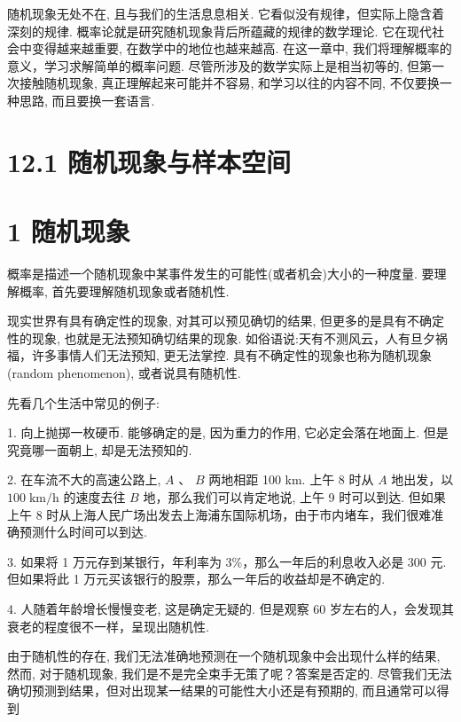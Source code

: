 \documentclass[10pt]{article}
\begin{document}
随机现象无处不在, 且与我们的生活息息相关. 它看似没有规律，但实际上隐含着深刻的规律. 概率论就是研究随机现象背后所蕴藏的规律的数学理论. 它在现代社会中变得越来越重要, 在数学中的地位也越来越高. 在这一章中, 我们将理解概率的意义，学习求解简单的概率问题. 尽管所涉及的数学实际上是相当初等的, 但第一次接触随机现象, 真正理解起来可能并不容易, 和学习以往的内容不同, 不仅要换一种思路, 而且要换一套语言.

\section*{12.1 随机现象与样本空间}

\section*{1 随机现象}

概率是描述一个随机现象中某事件发生的可能性(或者机会)大小的一种度量. 要理解概率, 首先要理解随机现象或者随机性.

现实世界有具有确定性的现象, 对其可以预见确切的结果, 但更多的是具有不确定性的现象, 也就是无法预知确切结果的现象. 如俗语说:天有不测风云，人有旦夕祸福，许多事情人们无法预知, 更无法掌控. 具有不确定性的现象也称为随机现象 (random phenomenon), 或者说具有随机性.

先看几个生活中常见的例子:

1. 向上抛掷一枚硬币. 能够确定的是, 因为重力的作用, 它必定会落在地面上. 但是究竟哪一面朝上, 却是无法预知的.

2. 在车流不大的高速公路上, \(A\text{ 、 }B\) 两地相距 100 km. 上午 8 时从 \(A\) 地出发，以 \({100}\mathrm{\;{km}}/\mathrm{h}\) 的速度去往 \(B\) 地，那么我们可以肯定地说, 上午 9 时可以到达. 但如果上午 8 时从上海人民广场出发去上海浦东国际机场，由于市内堵车，我们很难准确预测什么时间可以到达.

3. 如果将 1 万元存到某银行，年利率为 3\%，那么一年后的利息收入必是 300 元. 但如果将此 1 万元买该银行的股票，那么一年后的收益却是不确定的.

4. 人随着年龄增长慢慢变老, 这是确定无疑的. 但是观察 60 岁左右的人，会发现其衰老的程度很不一样，呈现出随机性.

由于随机性的存在, 我们无法准确地预测在一个随机现象中会出现什么样的结果, 然而, 对于随机现象, 我们是不是完全束手无策了呢？答案是否定的. 尽管我们无法确切预测到结果，但对出现某一结果的可能性大小还是有预期的, 而且通常可以得到

\section*{}
\end{document}
